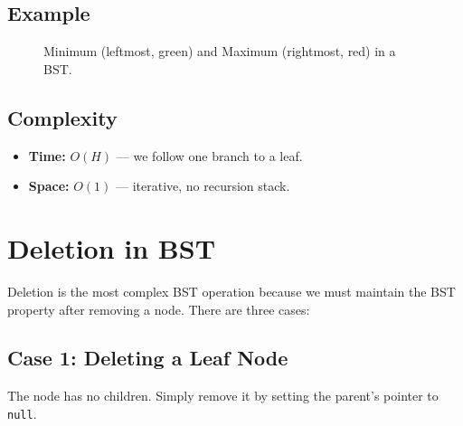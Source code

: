 \documentclass[10pt,journal,compsoc,onecolumn]{IEEEtran}
\begin{document}
\subsection{Example}

\begin{figure}[htbp]
\centering
{}
\caption{Minimum (leftmost, green) and Maximum (rightmost, red) in a BST.}
\end{figure}

\subsection{Complexity}

\begin{itemize}
    \item \textbf{Time:} $O(H)$ --- we follow one branch to a leaf.
    \item \textbf{Space:} $O(1)$ --- iterative, no recursion stack.
\end{itemize}

\section{Deletion in BST}
\label{sec:delete}

Deletion is the most complex BST operation because we must maintain the BST property after removing a node. There are three cases:

\subsection{Case 1: Deleting a Leaf Node}

The node has no children. Simply remove it by setting the parent's pointer to \texttt{null}.
\end{document}
